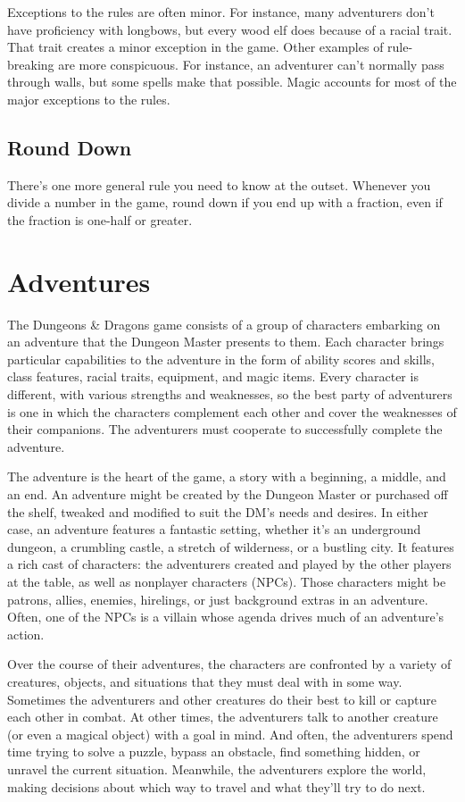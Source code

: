 Exceptions to the rules are often minor. For instance, many adventurers don’t have proficiency with longbows, but every wood elf does because of a racial trait. That trait creates a minor exception in the game. Other examples of rule-breaking are more conspicuous. For instance, an adventurer can’t normally pass through walls, but some spells make that possible. Magic accounts for most of the major exceptions to the rules.

\subsection{Round Down}
There’s one more general rule you need to know at the outset. Whenever you divide a number in the game, round down if you end up with a fraction, even if the fraction is one-half or greater.

\section{Adventures}
The Dungeons \& Dragons game consists of a group of characters embarking on an adventure that the Dungeon Master presents to them. Each character brings particular capabilities to the adventure in the form of ability scores and skills, class features, racial traits, equipment, and magic items. Every character is different, with various strengths and weaknesses, so the best party of adventurers is one in which the characters complement each other and cover the weaknesses of their companions. The adventurers must cooperate to successfully complete the adventure.

The adventure is the heart of the game, a story with a beginning, a middle, and an end. An adventure might be created by the Dungeon Master or purchased off the shelf, tweaked and modified to suit the DM’s needs and desires. In either case, an adventure features a fantastic setting, whether it’s an underground dungeon, a crumbling castle, a stretch of wilderness, or a bustling city. It features a rich cast of characters: the adventurers created and played by the other players at the table, as well as nonplayer characters (NPCs). Those characters might be patrons, allies, enemies, hirelings, or just background extras in an adventure. Often, one of the NPCs is a villain whose agenda drives much of an adventure’s action.

Over the course of their adventures, the characters are confronted by a variety of creatures, objects, and situations that they must deal with in some way. Sometimes the adventurers and other creatures do their best to kill or capture each other in combat. At other times, the adventurers talk to another creature (or even a magical object) with a goal in mind. And often, the adventurers spend time trying to solve a puzzle, bypass an obstacle, find something hidden, or unravel the current situation. Meanwhile, the adventurers explore the world, making decisions about which way to travel and what they’ll try to do next.

